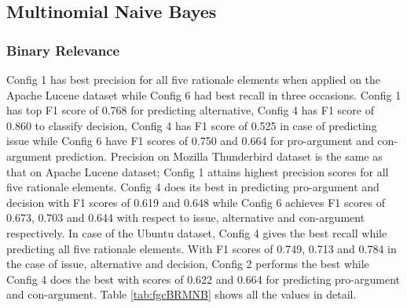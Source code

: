 \documentclass[a4paper,12pt,twoside]{report}
\begin{document}
\subsection{Multinomial Naive Bayes}

\subsubsection{Binary Relevance}
Config 1 has best precision for all five rationale elements when applied on the Apache Lucene dataset while Config 6 had best recall in three occasions. Config 1 has top F1 score of 0.768 for predicting alternative, Config 4 has F1 score of 0.860 to classify decision, Config 4 has F1 score of 0.525 in case of predicting issue while Config 6 have F1 scores of 0.750 and 0.664 for pro-argument and con-argument prediction. Precision on Mozilla Thunderbird dataset is the same as that on Apache Lucene dataset; Config 1 attains highest precision scores for all five rationale elements. Config 4 does its best in predicting pro-argument and decision with F1 scores of 0.619 and 0.648 while Config 6 achieves F1 scores of 0.673, 0.703 and 0.644 with respect to issue, alternative and con-argument respectively. In case of the Ubuntu dataset, Config 4 gives the best recall while predicting all five rationale elements. With F1 scores of 0.749, 0.713 and 0.784 in the case of issue, alternative and decision, Config 2 performs the best while Config 4 does the best with scores of 0.622 and 0.664 for predicting pro-argument and con-argument. Table \ref{tab:fgcBRMNB} shows all the values in detail.
\end{document}
